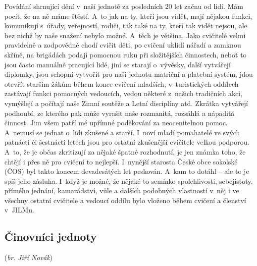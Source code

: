 \documentclass[a5paper, 11pt, twoside]{article}
\begin{document}
Povídání shrnující dění v~naší jednotě za posledních 20 let začnu od
lidí. Mám pocit, že na ně máme štěstí. A~to jak na ty, kteří jsou vidět,
mají nějakou funkci, komunikují s~úřady, veřejností, rodiči, tak také na
ty, kteří tak vidět nejsou, ale bez nichž by naše snažení nebylo možné.
A~těch je většina. Jako cvičitelé velmi pravidelně a zodpovědně chodí
cvičit děti, po cvičení uklidí nářadí a zamknou skříně, na brigádách
podají pomocnou ruku při složitějších činnostech, neboť to jsou často
manuálně pracující lidé, jiní se starají o~vývěsky, další vytvářejí
diplomky, jsou schopni vytvořit pro naši jednotu matriční a platební
systém, jdou otevřít starším žákům během konce cvičení mladších,
v~turistických oddílech zastávají funkci pomocných vedoucích, vedou
některé z~našich tradičních akcí, vymýšlejí a počítají naše Zimní
soutěže a Letní disciplíny atd. Zkrátka vytvářejí podhoubí, ze kterého
pak může vyrašit naše rozmanitá, rozsáhlá a nápaditá činnost. Jim všem
patří mé upřímné poděkování za neocenitelnou pomoc. A~nemusí se jednat
o~lidi zkušené a starší. I~noví mladí pomahatelé ve svých patnácti či
šestnácti letech jsou pro ostatní zkušenější cvičitele velkou podporou.
A~to, že je občas zkritizují za nějaké špatné rozhodnutí, je jen známka
toho, že chtějí i přes ně pro cvičení to nejlepší. I~nynější starosta
České obce sokolské (ČOS) byl takto koncem devadesátých let peskován.
A~kam to dotáhl -- ale to je spíš jeho zásluha. I~když je možné, že nějaké
to semínko spolehlivosti, sebejistoty, přímého jednání, kamarádství,
vůle a dalších podobných vlastností v~něj i ve všechny ostatní cvičitele
a vedoucí oddílu bylo vloženo během cvičení a členství v~JILMu.

\subsection{Činovníci jednoty}

(\textit{br. Jiří Novák})
\end{document}
